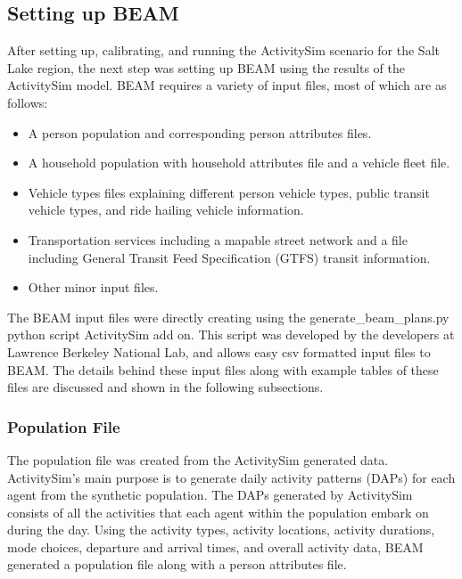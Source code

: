 \documentclass[12pt, oneside, openright]{byuthesis}
\providecommand{\tightlist}{%
  \setlength{\itemsep}{0pt}\setlength{\parskip}{0pt}}
\begin{document}
\hypertarget{setting-up-beam}{%
\subsection{Setting up BEAM}\label{setting-up-beam}}

After setting up, calibrating, and running the ActivitySim scenario for the Salt Lake region, the next step was setting up BEAM using the results of the ActivitySim model. BEAM requires a variety of input files, most of which are as follows:

\begin{itemize}
\tightlist
\item
  A person population and corresponding person attributes files.
\item
  A household population with household attributes file and a vehicle fleet file.
\item
  Vehicle types files explaining different person vehicle types, public transit vehicle types, and ride hailing vehicle information.
\item
  Transportation services including a mapable street network and a file including General Transit Feed Specification (GTFS) transit information.
\item
  Other minor input files.
\end{itemize}

The BEAM input files were directly creating using the generate\_beam\_plans.py python script ActivitySim add on. This script was developed by the developers at Lawrence Berkeley National Lab, and allows easy csv formatted input files to BEAM. The details behind these input files along with example tables of these files are discussed and shown in the following subsections.

\hypertarget{population-file}{%
\subsubsection{Population File}\label{population-file}}

The population file was created from the ActivitySim generated data. ActivitySim's main purpose is to generate daily activity patterns (DAPs) for each agent from the synthetic population. The DAPs generated by ActivitySim consists of all the activities that each agent within the population embark on during the day. Using the activity types, activity locations, activity durations, mode choices, departure and arrival times, and overall activity data, BEAM generated a population file along with a person attributes file.
\end{document}
